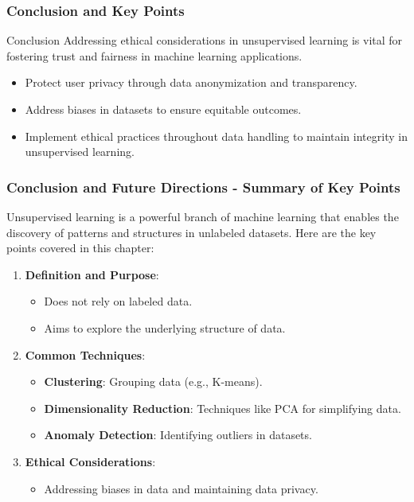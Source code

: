 \documentclass[aspectratio=169]{beamer}
\begin{document}
\begin{frame}[fragile]
    \frametitle{Conclusion and Key Points}
    \begin{block}{Conclusion}
        Addressing ethical considerations in unsupervised learning is vital for fostering trust and fairness in machine learning applications. 
    \end{block}
    \begin{itemize}
        \item Protect user privacy through data anonymization and transparency.
        \item Address biases in datasets to ensure equitable outcomes.
        \item Implement ethical practices throughout data handling to maintain integrity in unsupervised learning.
    \end{itemize}
\end{frame}

\begin{frame}[fragile]
    \frametitle{Conclusion and Future Directions - Summary of Key Points}
    Unsupervised learning is a powerful branch of machine learning that enables the discovery of patterns and structures in unlabeled datasets. Here are the key points covered in this chapter:
    
    \begin{enumerate}
        \item \textbf{Definition and Purpose}:
        \begin{itemize}
            \item Does not rely on labeled data.
            \item Aims to explore the underlying structure of data.
        \end{itemize}
        
        \item \textbf{Common Techniques}:
        \begin{itemize}
            \item \textbf{Clustering}: Grouping data (e.g., K-means).
            \item \textbf{Dimensionality Reduction}: Techniques like PCA for simplifying data.
            \item \textbf{Anomaly Detection}: Identifying outliers in datasets.
        \end{itemize}
        
        \item \textbf{Ethical Considerations}:
        \begin{itemize}
            \item Addressing biases in data and maintaining data privacy.
        \end{itemize}
    \end{enumerate}
\end{frame}
\end{document}
